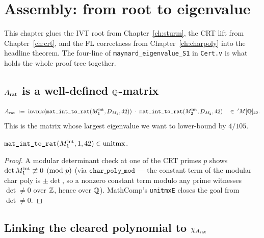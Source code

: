 \chapter{Assembly: from root to eigenvalue}\label{ch:assembly}

This chapter glues the IVT root from Chapter~\ref{ch:sturm}, the CRT
lift from Chapter~\ref{ch:crt}, and the FL correctness from
Chapter~\ref{ch:charpoly} into the headline theorem. The four-line
\Qed{} of \texttt{maynard\_eigenvalue\_S1} in \texttt{Cert.v} is what
holds the whole proof tree together.

\section{\texorpdfstring{$A_{\mathrm{rat}}$ is a well-defined $\mathbb{Q}$-matrix}{A\_rat is a well-defined Q-matrix}}

\begin{definition}\label{def:A_rat}
\rocqok
{}
\[
A_{\mathrm{rat}} \;:=\; \mathrm{invmx}(\texttt{mat\_int\_to\_rat}(M_1^{\mathrm{int}}, D_{M_1}, 42))
            \;\cdot\; \texttt{mat\_int\_to\_rat}(M_2^{\mathrm{int}}, D_{M_2}, 42)
\quad\in\; 'M[\mathbb{Q}]_{42}.
\]
This is the matrix whose largest eigenvalue we want to lower-bound by
$4/105$.
\end{definition}

\begin{lemma}\label{lem:M1_unit}
\rocqok
$\texttt{mat\_int\_to\_rat}(M_1^{\mathrm{int}}, 1, 42) \in \mathrm{unitmx}$.
\end{lemma}
\begin{proof}\rocqok
A modular determinant check at one of the CRT primes $p$ shows
$\det M_1^{\mathrm{int}} \not\equiv 0 \pmod p$
(via $\texttt{char\_poly\_mod}$ — the constant term of the modular
char poly is $\pm \det$, so a nonzero constant term modulo any prime
witnesses $\det \ne 0$ over $\mathbb{Z}$, hence over $\mathbb{Q}$). MathComp's
\texttt{unitmxE} closes the goal from $\det \ne 0$.
\end{proof}

\section{Linking the cleared polynomial to \texorpdfstring{$\chi_{A_{\mathrm{rat}}}$}{chi\_A\_rat}}


